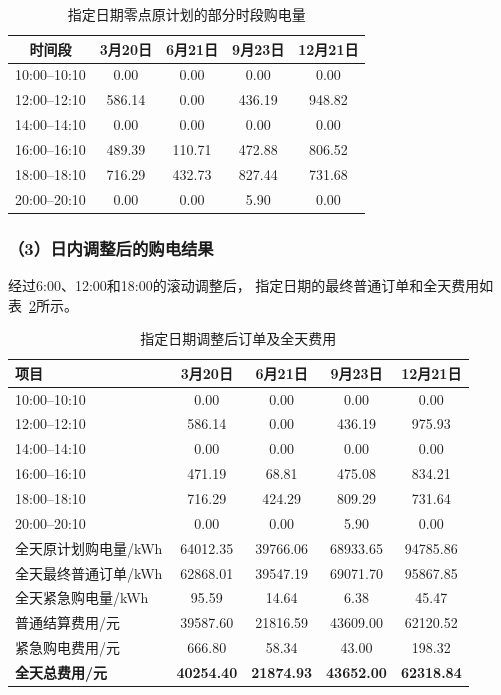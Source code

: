 \begin{table}[htbp]
\centering
\caption{指定日期零点原计划的部分时段购电量}
\label{tab:q3_original_order}
\begin{tabular}{ccccc}
\hline
时间段
& 3月20日
& 6月21日
& 9月23日
& 12月21日 \\
\hline
10:00--10:10 & 0.00   & 0.00   & 0.00   & 0.00 \\
12:00--12:10 & 586.14 & 0.00   & 436.19 & 948.82 \\
14:00--14:10 & 0.00   & 0.00   & 0.00   & 0.00 \\
16:00--16:10 & 489.39 & 110.71 & 472.88 & 806.52 \\
18:00--18:10 & 716.29 & 432.73 & 827.44 & 731.68 \\
20:00--20:10 & 0.00   & 0.00   & 5.90   & 0.00 \\
\hline
\end{tabular}
\end{table}


\subsubsection*{（3）日内调整后的购电结果}

经过6:00、12:00和18:00的滚动调整后，
指定日期的最终普通订单和全天费用如表~\ref{tab:q3_final_order}所示。

\begin{table}[htbp]
\centering
\caption{指定日期调整后订单及全天费用}
\label{tab:q3_final_order}
\begin{tabular}{lcccc}
\hline
项目
& 3月20日
& 6月21日
& 9月23日
& 12月21日 \\
\hline
10:00--10:10 & 0.00 & 0.00 & 0.00 & 0.00 \\
12:00--12:10 & 586.14 & 0.00 & 436.19 & 975.93 \\
14:00--14:10 & 0.00 & 0.00 & 0.00 & 0.00 \\
16:00--16:10 & 471.19 & 68.81 & 475.08 & 834.21 \\
18:00--18:10 & 716.29 & 424.29 & 809.29 & 731.64 \\
20:00--20:10 & 0.00 & 0.00 & 5.90 & 0.00 \\
\hline
全天原计划购电量/kWh
& 64012.35 & 39766.06 & 68933.65 & 94785.86 \\

全天最终普通订单/kWh
& 62868.01 & 39547.19 & 69071.70 & 95867.85 \\

全天紧急购电量/kWh
& 95.59 & 14.64 & 6.38 & 45.47 \\

普通结算费用/元
& 39587.60 & 21816.59 & 43609.00 & 62120.52 \\

紧急购电费用/元
& 666.80 & 58.34 & 43.00 & 198.32 \\

\textbf{全天总费用/元}
& \textbf{40254.40}
& \textbf{21874.93}
& \textbf{43652.00}
& \textbf{62318.84} \\
\hline
\end{tabular}
\end{table}

